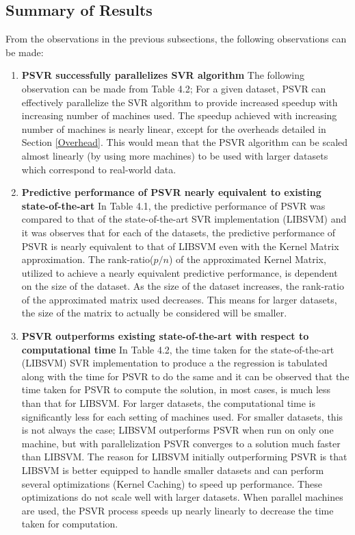 \documentclass[12pt]{article}
\begin{document}
\subsection{Summary of Results}
\label{Summary of Results}
From the observations in the previous subsections, the following observations can be made:
\begin{enumerate}[label=(\alph*)]
\item {\bf PSVR successfully parallelizes SVR algorithm}
\newline
The following observation can be made from Table 4.2; For a given dataset, PSVR can effectively parallelize the SVR algorithm to provide increased speedup with increasing number of machines used. The speedup achieved with increasing number of machines is nearly linear, except for the overheads detailed in Section \ref{Overhead}. This would  mean that the PSVR algorithm can be scaled almost linearly (by using more machines) to be used with larger datasets which correspond to real-world data.

\item {\bf Predictive performance of PSVR nearly equivalent to existing state-of-the-art}
\newline
In Table 4.1, the predictive performance of PSVR was compared to that of the state-of-the-art SVR implementation (LIBSVM) and it was observes that for each of the datasets, the predictive performance of PSVR is nearly equivalent to that of LIBSVM even with the Kernel Matrix approximation.
\newline
The rank-ratio($p/n$) of the approximated Kernel Matrix, utilized to achieve a nearly equivalent predictive performance, is dependent on the size of the dataset. As the size of the dataset increases, the rank-ratio of the approximated matrix used decreases. This means for larger datasets, the size of the matrix to actually be considered will be smaller.

\item {\bf PSVR outperforms existing state-of-the-art with respect to computational time}
\newline
In Table 4.2, the time taken for the state-of-the-art (LIBSVM) SVR implementation to produce a the regression is tabulated along with the time for PSVR to do the same and it can be observed that the time taken for PSVR to compute the solution, in most cases, is much less than that for LIBSVM. For larger datasets, the computational time is significantly less for each setting of machines used. 
\newline
For smaller datasets, this is not always the case; LIBSVM outperforms PSVR when run on only one machine, but with parallelization PSVR converges to a solution much faster than LIBSVM. The reason for LIBSVM initially outperforming PSVR is that LIBSVM is better equipped to handle smaller datasets and can perform several optimizations (Kernel Caching) to speed up performance. These optimizations do not scale well with larger datasets. When parallel machines are used, the PSVR process speeds up nearly linearly to decrease the time taken for computation.
\end{enumerate}
\cleardoublepage
\end{document}
